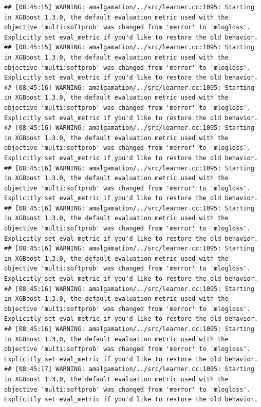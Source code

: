 \documentclass[
]{scrbook}
\begin{document}
\begin{verbatim}
## [08:45:15] WARNING: amalgamation/../src/learner.cc:1095: Starting in XGBoost 1.3.0, the default evaluation metric used with the objective 'multi:softprob' was changed from 'merror' to 'mlogloss'. Explicitly set eval_metric if you'd like to restore the old behavior.
## [08:45:15] WARNING: amalgamation/../src/learner.cc:1095: Starting in XGBoost 1.3.0, the default evaluation metric used with the objective 'multi:softprob' was changed from 'merror' to 'mlogloss'. Explicitly set eval_metric if you'd like to restore the old behavior.
## [08:45:16] WARNING: amalgamation/../src/learner.cc:1095: Starting in XGBoost 1.3.0, the default evaluation metric used with the objective 'multi:softprob' was changed from 'merror' to 'mlogloss'. Explicitly set eval_metric if you'd like to restore the old behavior.
## [08:45:16] WARNING: amalgamation/../src/learner.cc:1095: Starting in XGBoost 1.3.0, the default evaluation metric used with the objective 'multi:softprob' was changed from 'merror' to 'mlogloss'. Explicitly set eval_metric if you'd like to restore the old behavior.
## [08:45:16] WARNING: amalgamation/../src/learner.cc:1095: Starting in XGBoost 1.3.0, the default evaluation metric used with the objective 'multi:softprob' was changed from 'merror' to 'mlogloss'. Explicitly set eval_metric if you'd like to restore the old behavior.
## [08:45:16] WARNING: amalgamation/../src/learner.cc:1095: Starting in XGBoost 1.3.0, the default evaluation metric used with the objective 'multi:softprob' was changed from 'merror' to 'mlogloss'. Explicitly set eval_metric if you'd like to restore the old behavior.
## [08:45:16] WARNING: amalgamation/../src/learner.cc:1095: Starting in XGBoost 1.3.0, the default evaluation metric used with the objective 'multi:softprob' was changed from 'merror' to 'mlogloss'. Explicitly set eval_metric if you'd like to restore the old behavior.
## [08:45:16] WARNING: amalgamation/../src/learner.cc:1095: Starting in XGBoost 1.3.0, the default evaluation metric used with the objective 'multi:softprob' was changed from 'merror' to 'mlogloss'. Explicitly set eval_metric if you'd like to restore the old behavior.
## [08:45:16] WARNING: amalgamation/../src/learner.cc:1095: Starting in XGBoost 1.3.0, the default evaluation metric used with the objective 'multi:softprob' was changed from 'merror' to 'mlogloss'. Explicitly set eval_metric if you'd like to restore the old behavior.
## [08:45:17] WARNING: amalgamation/../src/learner.cc:1095: Starting in XGBoost 1.3.0, the default evaluation metric used with the objective 'multi:softprob' was changed from 'merror' to 'mlogloss'. Explicitly set eval_metric if you'd like to restore the old behavior.

\end{verbatim}
\end{document}
